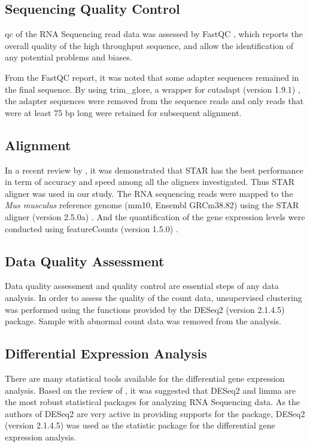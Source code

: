 \documentclass[12pt]{scrbook}
\begin{document}
\subsection{Sequencing Quality Control}
\Gls{qc} of the RNA Sequencing read data was assessed by FastQC \citep{Andrews2010}, which reports the overall quality of the high throughput sequence, and allow the identification of any potential problems and biases.

From the FastQC report, it was noted that some adapter sequences remained in the final sequence.
By using trim\_glore, a wrapper for cutadapt (version 1.9.1) \citep{Martin2011}, the adapter sequences were removed from the sequence reads and only reads that were at least 75 \gls{bp} long were retained for subsequent alignment. 

\subsection{Alignment}
In a recent review by \citet{Engstrom2013}, it was demonstrated that STAR \citep{Dobin2013} has the best performance in term of accuracy and speed among all the aligners investigated.
Thus STAR aligner was used in our study.
The RNA sequencing reads were mapped to the \textit{Mus musculus} reference genome (mm10, Ensembl GRCm38.82) using the STAR aligner (version 2.5.0a) \citep{Dobin2013}.
And the quantification of the gene expression levels were conducted using featureCounts (version 1.5.0) \citep{Liao2014}.

\subsection{Data Quality Assessment}
Data quality assessment and quality control are essential steps of any data analysis. 
In order to assess the quality of the count data, unsupervised clustering was performed using the functions provided by the DESeq2 (version 2.1.4.5) package.
Sample with abnormal count data was removed from the analysis. 

\subsection{Differential Expression Analysis}
There are many statistical tools available for the differential gene expression analysis.
Based on the review of \citet{Seyednasrollah2015}, it was suggested that DESeq2 and limma are the most robust statistical packages for analyzing RNA Sequencing data. 
As the authors of DESeq2 are very active in providing supports for the package, DESeq2 (version 2.1.4.5) \citep{Love2014} was used as the statistic package for the differential gene expression analysis.
\end{document}
